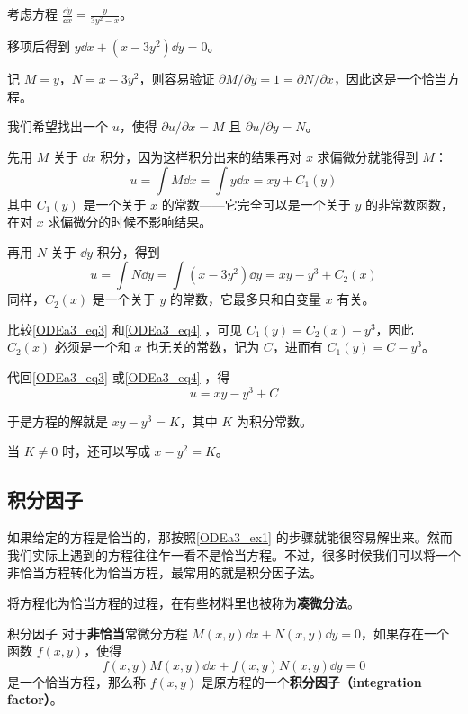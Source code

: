 \begin{example}{}\label{ODEa3_ex1}
考虑方程 $\frac{\dd y}{\dd x}=\frac{y}{3y^2-x}$。

移项后得到 $y\dd x+(x-3y^2)\dd y=0$。

记 $M=y$，$N=x-3y^2$，则容易验证 $\partial M/\partial y= 1 =\partial N/\partial x$，因此这是一个恰当方程。

我们希望找出一个 $u$，使得 $\partial u/\partial x=M$ 且 $\partial u/\partial y=N$。

先用 $M$ 关于 $\dd x$ 积分，因为这样积分出来的结果再对 $x$ 求偏微分就能得到 $M$：
\begin{equation}\label{ODEa3_eq3}
u=\int M\dd x=\int y\dd x=xy+C_1(y)
\end{equation}
其中 $C_1(y)$ 是一个关于 $x$ 的常数——它完全可以是一个关于 $y$ 的非常数函数，在对 $x$ 求偏微分的时候不影响结果。

再用 $N$ 关于 $\dd y$ 积分，得到
\begin{equation}\label{ODEa3_eq4}
u=\int N\dd y=\int (x-3y^2)\dd y=xy-y^3+C_2(x)
\end{equation}
同样，$C_2(x)$ 是一个关于 $y$ 的常数，它最多只和自变量 $x$ 有关。

比较\autoref{ODEa3_eq3} 和\autoref{ODEa3_eq4} ，可见 $C_1(y)=C_2(x)-y^3$，因此 $C_2(x)$ 必须是一个和 $x$ 也无关的常数，记为 $C$，进而有 $C_1(y)=C-y^3$。

代回\autoref{ODEa3_eq3} 或\autoref{ODEa3_eq4} ，得
\begin{equation}
u=xy-y^3+C
\end{equation}

于是方程的解就是 $xy-y^3=K$，其中 $K$ 为积分常数。

当 $K\not=0$ 时，还可以写成 $x-y^2=K$。

\end{example}


\subsection{积分因子}

如果给定的方程是恰当的，那按照\autoref{ODEa3_ex1} 的步骤就能很容易解出来。然而我们实际上遇到的方程往往乍一看不是恰当方程。不过，很多时候我们可以将一个非恰当方程转化为恰当方程，最常用的就是积分因子法。

将方程化为恰当方程的过程，在有些材料里也被称为\textbf{凑微分法}。

\begin{definition}{积分因子}
对于\textbf{非恰当}常微分方程 $M(x, y)\dd x+N(x, y)\dd y=0$，如果存在一个函数 $f(x, y)$，使得
\begin{equation}\label{ODEa3_eq5}
f(x, y)M(x, y)\dd x+f(x, y)N(x, y)\dd y=0
\end{equation}
是一个恰当方程，那么称 $f(x, y)$ 是原方程的一个\textbf{积分因子（integration factor）}。
\end{definition}

